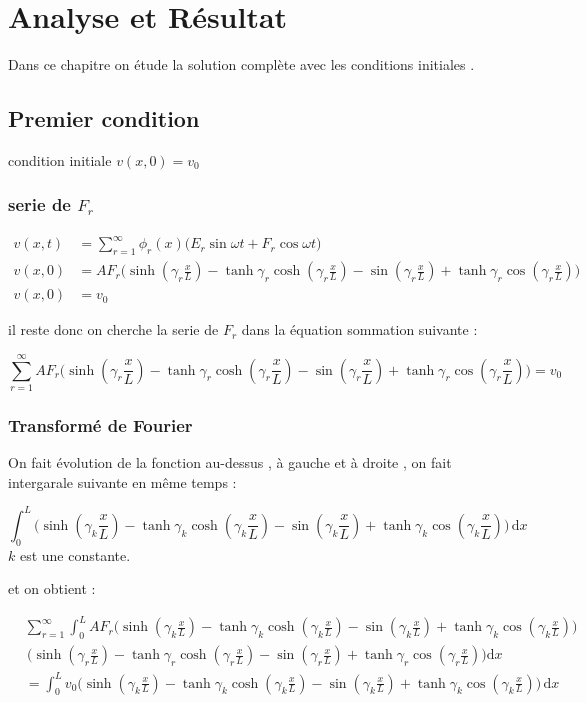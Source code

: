 \documentclass[a4paper,10pt]{report} %
\begin{document}
\chapter{Analyse et Résultat}

Dans ce chapitre on étude la solution complète avec les conditions initiales .

\section{Premier condition}
condition initiale $v(x,0)=v_0$ 
\subsection{serie de $F_r$}
\begin{align}
    v(x,t)&=\sum\limits_{r=1}^{\infty}\phi_r(x)(E_r\sin{\omega t}+F_r\cos{\omega t)}\\
    v(x,0)&=AF_r\Big(\sinh{(\gamma_r\frac{x}{L})}-\tanh{\gamma_r}\cosh{(\gamma_r\frac{x}{L})}-\sin{(\gamma_r\frac{x}{L})}+\tanh{\gamma_r}\cos{(\gamma_r\frac{x}{L})}\Big)\\
    v(x,0)&=v_0
\end{align}

il reste donc on cherche la serie de $F_r$ dans la équation sommation suivante :

\begin{equation}
    \sum\limits_{r=1}^{\infty}AF_r\Big(\sinh{(\gamma_r\frac{x}{L})}-\tanh{\gamma_r}\cosh{(\gamma_r\frac{x}{L})}-\sin{(\gamma_r\frac{x}{L})}+\tanh{\gamma_r}\cos{(\gamma_r\frac{x}{L})}\Big)=v_0
\end{equation}

\subsection{Transformé de Fourier}

On fait évolution de la fonction au-dessus , à gauche et à droite , on fait intergarale suivante en même temps : 

\begin{equation}
    \int_0^L \Big(\sinh{(\gamma_k\frac{x}{L})}-\tanh{\gamma_k}\cosh{(\gamma_k\frac{x}{L})}-\sin{(\gamma_k\frac{x}{L})}+\tanh{\gamma_k}\cos{(\gamma_k\frac{x}{L})}\Big)\, \mathrm dx\,
\end{equation}
$k$ est une constante.


et on obtient : 

\begin{align}
    &\sum\limits_{r=1}^{\infty}\int_0^L AF_r\Big(\sinh{(\gamma_k\frac{x}{L})}-\tanh{\gamma_k}\cosh{(\gamma_k\frac{x}{L})}-\sin{(\gamma_k\frac{x}{L})}+\tanh{\gamma_k}\cos{(\gamma_k\frac{x}{L})}\Big)\\
    &\,\Big(\sinh{(\gamma_r\frac{x}{L})}-\tanh{\gamma_r}\cosh{(\gamma_r\frac{x}{L})}-\sin{(\gamma_r\frac{x}{L})}+\tanh{\gamma_r}\cos{(\gamma_r\frac{x}{L})}\Big)\mathrm dx\\
    &=\int_0^L v_0\Big(\sinh{(\gamma_k\frac{x}{L})}-\tanh{\gamma_k}\cosh{(\gamma_k\frac{x}{L})}-\sin{(\gamma_k\frac{x}{L})}+\tanh{\gamma_k}\cos{(\gamma_k\frac{x}{L})}\Big)\,\mathrm dx
\end{align}
 
\end{document}
